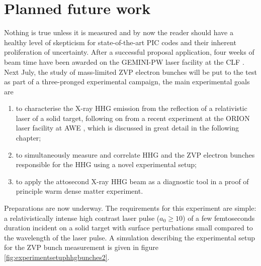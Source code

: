 


\section{Planned future work}\label{sec:zvp-future_work}
Nothing is true unless it is measured and by now the reader should have a healthy level of skepticism for state-of-the-art PIC codes and their inherent proliferation of uncertainty. After a successful proposal application, four weeks of beam time have been awarded on the GEMINI-PW laser facility at the \ac{CLF} \cite{LaserSystemGemini}. Next July, the study of mass-limited ZVP electron bunches will be put to the test as part of a three-pronged experimental campaign, the main experimental goals are
\begin{enumerate}
	\item to characterise the X-ray \ac{HHG} emission from the reflection of a relativistic laser of a solid target, following on from a recent experiment at the ORION laser facility at AWE \cite{hoppsOverviewLaserSystems2013}, which is discussed in great detail in the following chapter;
	\item to simultaneously measure and correlate \ac{HHG} and the ZVP electron bunches responsible for the \ac{HHG} using a novel experimental setup;
	\item to apply the attosecond X-ray \ac{HHG} beam as a diagnostic tool in a proof of principle warm dense matter experiment.
\end{enumerate}
Preparations are now underway. The requirements for this experiment are simple: a relativistically intense high contrast laser pulse ($a_0 \ge 10$) of a few femtoseconds duration incident on a solid target with surface perturbations small compared to the wavelength of the laser pulse. A simulation describing the experimental setup for the ZVP bunch measurement is given in figure \ref{fig:experimentsetuphhgbunches2}. 

